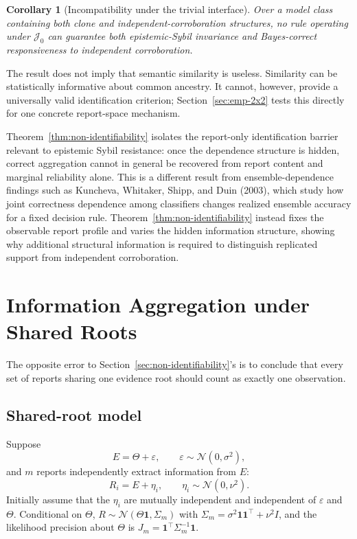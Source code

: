 \documentclass[11pt]{article}
\newtheorem{corollary}{Corollary}
\theoremstyle{definition}
\begin{document}
\begin{corollary}[Incompatibility under the trivial interface]
Over a model class containing both clone and independent-corroboration structures, no rule operating under $\mathcal J_0$ can guarantee both epistemic-Sybil invariance and Bayes-correct responsiveness to independent corroboration.
\end{corollary}

The result does not imply that semantic similarity is useless. Similarity can be statistically informative about common ancestry. It cannot, however, provide a universally valid identification criterion; Section~\ref{sec:emp-2x2} tests this directly for one concrete report-space mechanism.

Theorem~\ref{thm:non-identifiability} isolates the report-only identification barrier relevant to epistemic Sybil resistance: once the dependence structure is hidden, correct aggregation cannot in general be recovered from report content and marginal reliability alone. This is a different result from ensemble-dependence findings such as Kuncheva, Whitaker, Shipp, and Duin (2003), which study how joint correctness dependence among classifiers changes realized ensemble accuracy for a fixed decision rule. Theorem~\ref{thm:non-identifiability} instead fixes the observable report profile and varies the hidden information structure, showing why additional structural information is required to distinguish replicated support from independent corroboration.

\section{Information Aggregation under Shared Roots}
\label{sec:shared-roots}

The opposite error to Section~\ref{sec:non-identifiability}'s is to conclude that every set of reports sharing one evidence root should count as exactly one observation.

\subsection{Shared-root model}
\label{sec:shared-root-model}

Suppose
\[
E=\Theta+\varepsilon,
\qquad
\varepsilon\sim\mathcal N(0,\sigma^2),
\]
and $m$ reports independently extract information from $E$:
\[
R_i=E+\eta_i,
\qquad
\eta_i\sim\mathcal N(0,\nu^2).
\]
Initially assume that the $\eta_i$ are mutually independent and independent of $\varepsilon$ and $\Theta$. Conditional on $\Theta$, $R\sim\mathcal N(\Theta\mathbf 1,\Sigma_m)$ with $\Sigma_m=\sigma^2\mathbf 1\mathbf 1^\top+\nu^2I$, and the likelihood precision about $\Theta$ is $J_m=\mathbf 1^\top\Sigma_m^{-1}\mathbf 1$.
\end{document}

